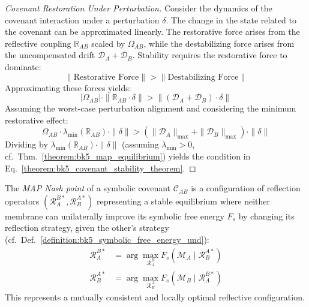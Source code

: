 \begin{proof}[Covenant Restoration Under Perturbation]
\label{proof:bk5_covenant_perturbation_restoration}
Consider the dynamics of the covenant interaction under a perturbation $\delta$. The change in the state related to the covenant can be approximated linearly. The restorative force arises from the reflective coupling $\mathbb{R}_{AB}$ scaled by $\Omega_{AB}$, while the destabilizing force arises from the uncompensated drift $\mathcal{D}_A + \mathcal{D}_B$. Stability requires the restorative force to dominate:
\begin{equation}
\|\text{Restorative Force}\| > \|\text{Destabilizing Force}\|
\end{equation}
Approximating these forces yields:
\begin{equation}
|\Omega_{AB}| \cdot \|\mathbb{R}_{AB} \cdot \delta\| > \|(\mathcal{D}_A + \mathcal{D}_B) \cdot \delta\|
\end{equation}
Assuming the worst-case perturbation alignment and considering the minimum restorative effect:
\begin{equation}
\Omega_{AB} \cdot \lambda_{\min}(\mathbb{R}_{AB}) \cdot \|\delta\| > (\|\mathcal{D}_A\|_{\max} + \|\mathcal{D}_B\|_{\max}) \cdot \|\delta\|
\end{equation}
Dividing by $\lambda_{\min}(\mathbb{R}_{AB}) \cdot \|\delta\|$ (assuming $\lambda_{\min} > 0$, cf.~Thm.~\ref{theorem:bk5_map_equilibrium}) yields the condition in Eq.~\eqref{theorem:bk5_covenant_stability_theorem}.
\end{proof}
\begin{definition}
\label{definition:bk5_map_nash_point}
The \emph{MAP Nash point} of a symbolic covenant $\mathcal{C}_{AB}$ is a configuration of reflection operators $(\mathcal{R}_A^{B*}, \mathcal{R}_B^{A*})$ representing a stable equilibrium where neither membrane can unilaterally improve its symbolic free energy $F_s$ by changing its reflection strategy, given the other's strategy (cf.~Def.~\ref{definition:bk5_symbolic_free_energy_und}):
\begin{align}
    \mathcal{R}_{A}^{B*} &= \arg\max_{\mathcal{R}_{A}^B} F_s(\mathscr{M}_A \mid \mathcal{R}_{B}^{A*}) \\
    \mathcal{R}_{B}^{A*} &= \arg\max_{\mathcal{R}_{B}^A} F_s(\mathscr{M}_B \mid \mathcal{R}_{A}^{B*}) 
\end{align}
This represents a mutually consistent and locally optimal reflective configuration.
\end{definition}

